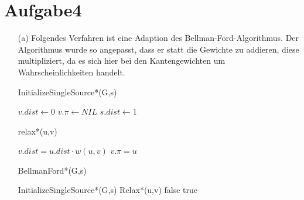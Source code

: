\documentclass{article}
\begin{document}
\section*{Aufgabe4}
\begin{enumerate}
\item[(a)] Folgendes Verfahren ist eine Adaption des Bellman-Ford-Algorithmus.
Der Algorithmus wurde so angepasst, dass er statt die Gewichte zu addieren,
diese multipliziert, da es sich hier bei den Kantengewichten um
Wahrscheinlichkeiten handelt.

\begin{algorithm}
\caption{InitializeSingleSource*(G,s)}
\begin{algorithmic}
\STATE \(v.dist \leftarrow 0\)
\STATE \(v.\pi \leftarrow NIL\)
\ENDFOR
\STATE \(s.dist \leftarrow 1\)
\end{algorithmic}
\end{algorithm}

\begin{algorithm}
\caption{relax*(u,v)}
\begin{algorithmic}
\STATE \( v.dist = u.dist \cdot w(u,v) \)
\STATE \( v.\pi = u \)
\ENDIF
\end{algorithmic}
\end{algorithm}

\begin{algorithm}
\caption{BellmanFord*(G,s)}
\begin{algorithmic}
\STATE InitializeSingleSource*(G,s)
\STATE Relax*(u,v)
\ENDFOR
\ENDFOR
{}
\RETURN false
\ENDIF
\ENDFOR
\RETURN true

\end{algorithmic}
\end{algorithm}

\end{enumerate}
\end{document}
